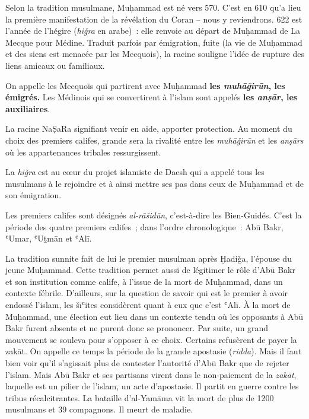 Selon la tradition musulmane, Muḥammad est né vers 570. C'est en 610
qu'a lieu la première manifestation de la révélation du Coran -- nous y
reviendrons. 622 est l'année de l'hégire (\emph{hiǧra} en arabe)~: elle
renvoie au départ de Muḥammad de La Mecque pour Médine. Traduit parfois
par émigration, fuite (la vie de Muḥammad et des siens est menacée par
les Mecquois), la racine souligne l'idée de rupture des liens amicaux ou
familiaux.

\begin{Def}
On appelle les Mecquois qui partirent avec Muḥammad
\textbf{les \emph{muhāǧirūn}, les émigrés.} Les Médinois qui se
convertirent à l'islam sont appelés \textbf{les \emph{anṣār}, les
auxiliaires}.
\end{Def}
La racine NaṢaRa signifiant venir en aide, apporter
protection.
Au moment du choix des premiers califes, grande sera la rivalité entre
les \emph{muhāǧirūn} et les \emph{anṣārs} où les appartenances tribales
ressurgissent.

La \emph{hiǧra} est au cœur du projet islamiste de Daesh qui a appelé
tous les musulmans à le rejoindre et à ainsi mettre ses pas dans ceux de
Muḥammad et de son émigration.

Les premiers califes sont désignés \emph{al-rāšidūn}, c'est-à-dire les
Bien-Guidés. C'est la période des quatre premiers califes~; dans l'ordre
chronologique~: Abū Bakr, ʿUmar, ʿUṯmān et ʿAlī.


La tradition sunnite fait de lui le premier musulman après Ḫadiǧa,
l'épouse du jeune Muḥammad. Cette tradition permet aussi de légitimer le
rôle d'Abū Bakr et son institution comme calife, à l'issue de la mort de
Muḥammad, dans un contexte fébrile. D'ailleurs, sur la question de
savoir qui est le premier à avoir endossé l'islam, les šīʿites
considèrent quant à eux que c'est ʿAlī. À la mort de Muḥammad, une
élection eut lieu dans un contexte tendu où les opposants à Abū Bakr
furent absents et ne purent donc se prononcer. Par suite, un grand
mouvement se souleva pour s'opposer à ce choix. Certains refusèrent de
payer la zakāt. On appelle ce temps la période de la grande apostasie
(\emph{ridda}). Mais il faut bien voir qu'il s'agissait plus de
contester l'autorité d'Abū Bakr que de rejeter l'islam. Mais Abū Bakr et
ses partisans virent dans le non-paiement de la \emph{zakāt}, laquelle
est un pilier de l'islam, un acte d'apostasie. Il partit en guerre
contre les tribus récalcitrantes. La bataille d'al-Yamāma vit la mort de
plus de 1200 musulmans et 39 compagnons. Il meurt de maladie.

